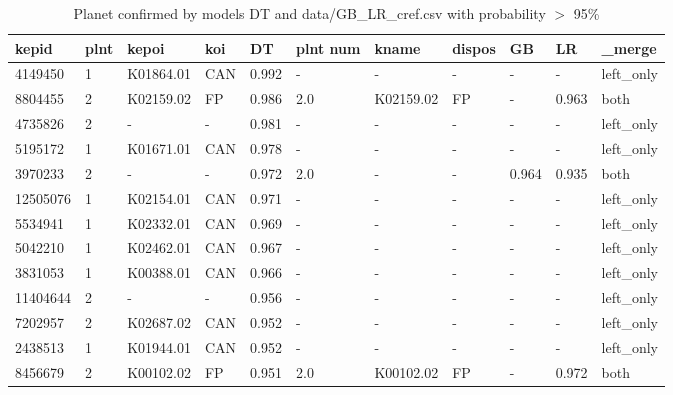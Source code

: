 \begin{table}[!htbp]
 \centering
 \caption{Planet confirmed by models DT and data/GB\_LR\_cref.csv with probability $>$ 95\%}
 \label{dataDTGBLRcreftab} 
  \begin{tabular}
{| 
 p{}| 
 p{}| 
 p{}| 
 p{}| 
 p{}| 
 p{}| 
 p{}| 
 p{}| 
 p{}| 
 p{}| 
 p{}| 
}\hline 
\textbf{kepid} &\textbf{plnt} &\textbf{kepoi} &\textbf{koi} &\textbf{DT} &\textbf{plnt num} &\textbf{kname} &\textbf{dispos} &\textbf{GB} &\textbf{LR} &\textbf{\_merge} \\ \hline 
4149450 &1 &K01864.01 &CAN &0.992 &- &- &- &- &- &left\_only \\ \hline 
8804455 &2 &K02159.02 &FP &0.986 &2.0 &K02159.02 &FP &- &0.963 &both \\ \hline 
4735826 &2 &- &- &0.981 &- &- &- &- &- &left\_only \\ \hline 
5195172 &1 &K01671.01 &CAN &0.978 &- &- &- &- &- &left\_only \\ \hline 
3970233 &2 &- &- &0.972 &2.0 &- &- &0.964 &0.935 &both \\ \hline 
12505076 &1 &K02154.01 &CAN &0.971 &- &- &- &- &- &left\_only \\ \hline 
5534941 &1 &K02332.01 &CAN &0.969 &- &- &- &- &- &left\_only \\ \hline 
5042210 &1 &K02462.01 &CAN &0.967 &- &- &- &- &- &left\_only \\ \hline 
3831053 &1 &K00388.01 &CAN &0.966 &- &- &- &- &- &left\_only \\ \hline 
11404644 &2 &- &- &0.956 &- &- &- &- &- &left\_only \\ \hline 
7202957 &2 &K02687.02 &CAN &0.952 &- &- &- &- &- &left\_only \\ \hline 
2438513 &1 &K01944.01 &CAN &0.952 &- &- &- &- &- &left\_only \\ \hline 
8456679 &2 &K00102.02 &FP &0.951 &2.0 &K00102.02 &FP &- &0.972 &both \\ \hline 
\end{tabular} 
\end{table}